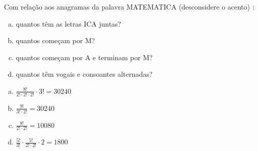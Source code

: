 \begin{ex}
Com relação aos anagramas da palavra MATEMATICA (desconsidere o acento) :
   \begin{enumerate}[(a)]
   \item quantos têm as letras ICA juntas?
   \item quantos começam por M?
   \item quantos começam por A e terminam por M?
   \item quantos têm vogais e consoantes alternadas?
   \end{enumerate}
    \begin{sol}
      \phantom{A}
        \begin{enumerate} [(a)]
            \item $\frac{8!}{2!\cdot2!\cdot2!}\cdot3!=30240$
            \item $\frac{9!}{3!\cdot2!}=30240$
            \item $\frac{8!}{2!\cdot2!}=10080$
            \item $\frac{5!}{3!}\cdot\frac{5!}{2!\cdot2!}\cdot2=1800$
        \end{enumerate}
    \end{sol}
\end{ex}